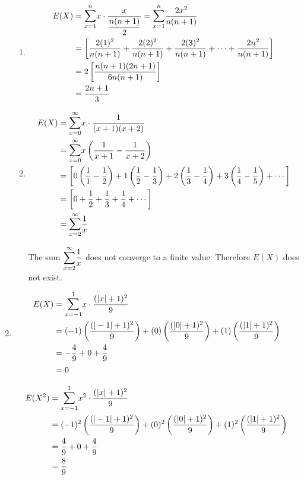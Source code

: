 \documentclass{article}
\begin{document}
\begin{enumerate}
\begin{enumerate}
       \item
	  \begin{align*}
	   E(X) &= \mathlarger{\sum}_{x=1}^n{x\cdot \dfrac{x}{\dfrac{n(n+1)}{2}}}
		  = \mathlarger{\sum}_{x=1}^n{\dfrac{2x^2}{n(n+1)}} \\
	      &= \left[ \dfrac{2(1)^2}{n(n+1)} + \dfrac{2(2)^2}{n(n+1)} + \dfrac{2(3)^2}{n(n+1)} +
		  \cdots + \dfrac{2n^2}{n(n+1)} \right] \\
	      &= 2 \left[ \dfrac{n(n+1)(2n+1)}{6n(n+1)} \right] \\
	      &= \dfrac{2n+1}{3}
	  \end{align*}
	  
       \item
	  \begin{align*}
	   E(X) &= \mathlarger{\sum}_{x=0}^\infty{x \cdot \dfrac{1}{(x+1)(x+2)}} \\
	      &= \mathlarger{\sum}_{x=0}^\infty{x\left(\dfrac{1}{x+1}-\dfrac{1}{x+2}\right)} \\
	      &= \left[ 0\left(\dfrac{1}{1} - \dfrac{1}{2}\right) + 
		  1\left(\dfrac{1}{2} - \dfrac{1}{3}\right) + 2\left(\dfrac{1}{3} - \dfrac{1}{4}\right)
		  + 3\left(\dfrac{1}{4} - \dfrac{1}{5}\right) + \cdots \right] \\
	      &= \left[ 0 + \dfrac{1}{2} + \dfrac{1}{3} + \dfrac{1}{4} + \cdots \right] \\
	      &= \mathlarger{\sum}_{x=2}^\infty{\dfrac{1}{x}}
	  \end{align*}
	  
	  The sum $\mathlarger{\sum}_{x=2}^\infty{\dfrac{1}{x}}$ does not converge to a finite
	value. Therefore $E(X)$ does not exist.

      \end{enumerate}

     \item 
	\begin{align*}
	 E(X) &= \mathlarger{\sum}_{x = -1}^1{x \cdot \dfrac{(|x| + 1)^2}{9}} \\
	    &= (-1)\left(\dfrac{(|-1| + 1)^2}{9}\right) + (0)\left(\dfrac{(|0|+ 1)^2}{9}\right)
		+ (1)\left(\dfrac{(|1| + 1)^2}{9}\right) \\
	    &= -\dfrac{4}{9} + 0 + \dfrac{4}{9} \\
	    &= 0
	\end{align*}
	
	\begin{align*}
	 E(X^2) &= \mathlarger{\sum}_{x = -1}^1{x^2 \cdot \dfrac{(|x| + 1)^2}{9}} \\
	    &= (-1)^2\left(\dfrac{(|-1| + 1)^2}{9}\right) + (0)^2\left(\dfrac{(|0|+ 1)^2}{9}\right)
		+ (1)^2\left(\dfrac{(|1| + 1)^2}{9}\right) \\
	    &= \dfrac{4}{9} + 0 + \dfrac{4}{9} \\
	    &= \dfrac{8}{9}
	\end{align*}
	

\end{enumerate}
\end{document}

